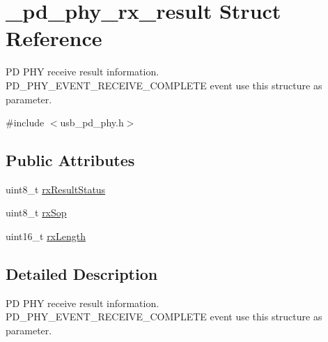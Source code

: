 \hypertarget{struct__pd__phy__rx__result}{\section{\-\_\-pd\-\_\-phy\-\_\-rx\-\_\-result Struct Reference}
\label{struct__pd__phy__rx__result}
}


P\-D P\-H\-Y receive result information. P\-D\-\_\-\-P\-H\-Y\-\_\-\-E\-V\-E\-N\-T\-\_\-\-R\-E\-C\-E\-I\-V\-E\-\_\-\-C\-O\-M\-P\-L\-E\-T\-E event use this structure as parameter.  




{\ttfamily \#include $<$usb\-\_\-pd\-\_\-phy.\-h$>$}

\subsection*{Public Attributes}
\begin{DoxyCompactItemize}
\item 
uint8\-\_\-t \hyperlink{struct__pd__phy__rx__result_a29f871220a1cc0617a6c5dd86e222f60}{rx\-Result\-Status}
\item 
uint8\-\_\-t \hyperlink{struct__pd__phy__rx__result_a70f74c4fbff251a4e08c91977e0c2871}{rx\-Sop}
\item 
uint16\-\_\-t \hyperlink{struct__pd__phy__rx__result_a897dc52bf49a0d66a2aec6c4cff86a5b}{rx\-Length}
\end{DoxyCompactItemize}


\subsection{Detailed Description}
P\-D P\-H\-Y receive result information. P\-D\-\_\-\-P\-H\-Y\-\_\-\-E\-V\-E\-N\-T\-\_\-\-R\-E\-C\-E\-I\-V\-E\-\_\-\-C\-O\-M\-P\-L\-E\-T\-E event use this structure as parameter. 

